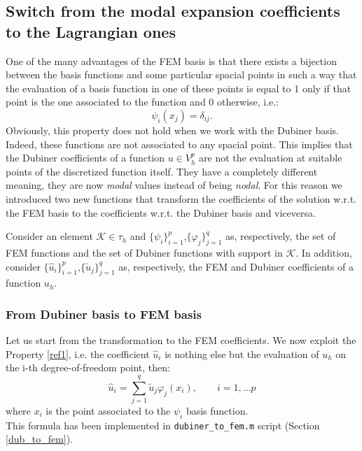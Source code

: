 \documentclass[a4paper,11pt]{article}
\begin{document}
\subsection{Switch from the modal expansion coefficients to the Lagrangian ones} \label{FEM_DUB_conversion}
One of the many advantages of the FEM basis is that there exists a bijection between the basis functions and some particular spacial points in such a way that the evaluation of a basis function in one of these points is equal to 1 only if that point is the one associated to the function and 0 otherwise, i.e.:
	\begin{equation} \label{ref1}
	\psi_i(x_j)=\delta_{ij}.
	\end{equation}
	Obviously, this property does not hold when we work with the Dubiner basis. Indeed, these functions are not associated to any spacial point. This implies that the Dubiner coefficients of a function $u\in V_h^p$ are not the evaluation at suitable points of the discretized function itself. They have a completely different meaning, they are now \emph{modal} values instead of being \emph{nodal}.
	For this reason we introduced two new functions that transform the coefficients of the solution w.r.t. the FEM basis to the coefficients w.r.t. the Dubiner basis and viceversa.\vspace{5mm}
	
	\noindent Consider an element $\mathcal{K}\in \tau_h$ and $\{\psi_{i}\}_{i=1}^{p}$,$\{\varphi_{j}\}_{j=1}^{q}$ as, respectively, the set of FEM functions and the set of Dubiner functions with support in $\mathcal{K}$. In addition, consider $\{\hat{u}_i\}_{i=1}^p$,$\{\tilde{u}_j\}_{j=1}^q$ as, respectively, the FEM and Dubiner coefficients of a function $u_h$.
	
	\subsubsection{From Dubiner basis to FEM basis}
	\noindent Let us start from the transformation to the FEM coefficients. We now exploit the Property \ref{ref1}, i.e. the coefficient $\hat{u}_i$ is nothing else but the evaluation of $u_h$ on the i-th degree-of-freedom point, then: 
	\begin{equation} \label{ref3}
	\hat{u}_i = \sum_{j=1}^q \tilde{u}_j\varphi_j(x_i), \qquad i=1, \dots p
	\end{equation}
	where $x_i$ is the point associated to the $\psi_i$ basis function. \\
	This formula has been implemented in \texttt{dubiner\_to\_fem.m} script (Section \ref{dub_to_fem}).
\end{document}
